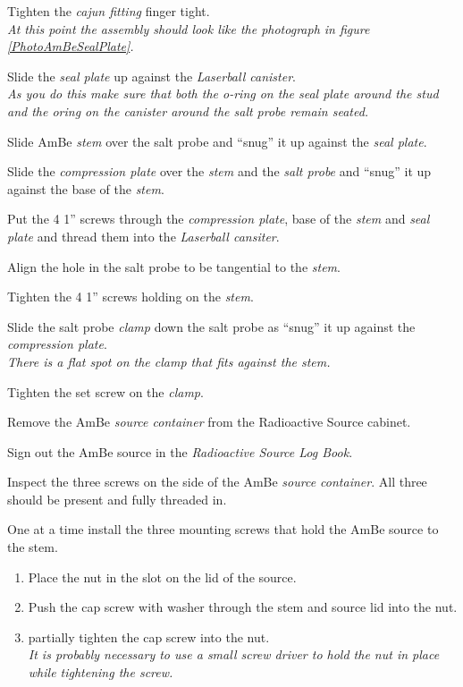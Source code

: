 \begin{enumerate}
\checkitem Tighten the {\em cajun fitting} finger tight.\\
  {\small\em At this point the assembly should look like the
   photograph in figure \ref{PhotoAmBeSealPlate}.}

\checkitem Slide the {\em seal plate} up against the 
   {\em Laserball canister}.\\
  {\em As you do this make sure that both the o-ring on the seal plate
    around the stud and the oring on the canister around the salt probe
    remain seated.}

\checkitem Slide AmBe {\em stem} over the salt probe and ``snug'' it up
  against the {\em seal plate}.

\checkitem Slide the {\em compression plate} over the {\em stem} and
  the {\em salt probe} and ``snug'' it up against the base of the {\em stem}.

\checkitem Put the 4 1'' screws through the {\em compression plate},
   base of the {\em stem} and {\em seal plate} and thread them into
   the {\em Laserball cansiter}.

\checkitem Align the  hole in the salt probe to be tangential to
  the {\em stem}.

\checkitem Tighten the 4 1'' screws holding on the {\em stem}.

\checkitem Slide the salt probe {\em clamp} down the salt probe as ``snug''
  it up against the {\em compression plate}. \\
  {\em There is a flat spot on the clamp that fits against the stem.}

\checkitem Tighten the set screw on the {\em clamp}.

\checkitem Remove the AmBe {\em source container} from the Radioactive Source
  cabinet.

\checkitem Sign out the AmBe source in the {\em Radioactive Source Log Book}.

\checkitem  Inspect the three screws on the side of the
  AmBe {\em source container}.  All three should be present and
  fully threaded in.

\checkitem One at a time install the three mounting screws that hold the
  AmBe source to the stem.
  \begin{enumerate}
  \item Place the nut in the slot on the lid of the source.
  \item Push the cap screw with washer through the stem and source lid
    into the nut.
  \item partially tighten the cap screw into the nut.\\
    {\em It is probably necessary to use a small screw driver to hold
      the nut in place while tightening the screw.}
  \end{enumerate}
  

\end{enumerate}
